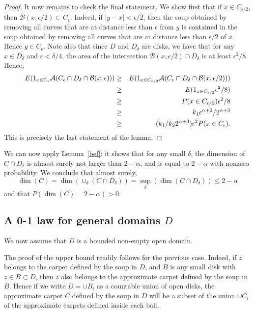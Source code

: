 \documentclass[11pt]{article}
\newcommand{\eps}{\epsilon}
\newcommand{\PP}{{ P}}
\newcommand{\EE}{{ E}}
\newcommand{\B}{{\mathcal B}}
\begin{document}
\begin{proof}
It now remains to check the final statement.
We show first that if $x \in C_{\eps/2}$, then $\B(x, \eps/2) \subset C_\eps$. 
Indeed, if $|y-x| < \eps/2$, then
the soup obtained by removing all curves that are at distance less 
than $\eps$ from $y$ is contained in the soup obtained by removing 
all curves that are at distance less than $\eps/2$ of $x$. 
Hence $y \in C_\eps$. 
Note also that since $D$ and $D_\delta$ are disks, we have that
for any $x \in D_\delta$ and $\eps < \delta / 4$, 
the area of the intersection 
$\B(x, \eps/2) \cap D_\delta$ is at least  $\eps^2/8$. 
Hence, 
\begin {eqnarray*}
\EE ( 1_{ x \in C_\eps } {\cal A} ( C_ \eps \cap D_\delta \cap \B(x, \eps ) ) ) 
& \ge & 
\EE ( 1_{x \in C_{\eps/2 }} {\cal A} ( C_{\eps} \cap D_\delta \cap \B(x, \eps/2))) \\
& \ge &
\EE ( 1_{x \in C_{\eps /2}} \eps^2 / 8 ) \\
& \ge & 
\PP (x \in C_{\eps /2}) \eps^2 / 8 \\
& \ge &
k_1 \eps^{\alpha + 2} / 2^{\alpha +3} 
\\
& \ge & 
(k_1 / k_2 2^{\alpha+3} ) \eps^2 \PP ( x \in C_ \eps ) 
. \end {eqnarray*}
This is precisely the last statement of the lemma.
\end{proof}

We can now apply Lemma~\ref{bef}: it shows that for any small $\delta$, 
the dimension of $C \cap D_\delta$ is almost surely not larger than $2 - \alpha$,
and is equal to $2-\alpha$ with nonzero probability.
We conclude that almost surely,
$$ \dim (C) = \dim \left( \cup_\delta (C \cap D_\delta) \right) = 
\sup_\delta  \left( \dim (C \cap D_\delta)  \right) \le 2-\alpha $$
and that 
$P ( \dim (C)  = 2 - \alpha ) > 0$.

\subsection {A 0-1 law for general domains $D$}

We now assume that $D$ is a bounded non-empty open domain.


The proof of the upper bound readily follows for the previous case.
Indeed, if $z$ belongs to the carpet defined by the soup in $D$,
and $B$ is any small disk with $z \in B \subset D$, then $z$ also
belongs to the approximate carpet defined by the soup in $B$.
Hence if we write $D = \cup B_i$ as a countable union of open disks,
the approximate carpet $C$ defined by the soup in $D$ will be a subset of the union
$ \cup C_i$ of the approximate carpets defined inside each ball.
 
\end{document}
